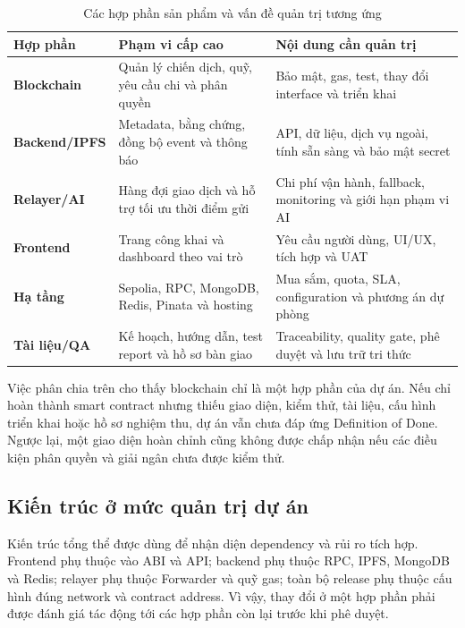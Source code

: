 \begin{table}[H]
\centering
\caption{Các hợp phần sản phẩm và vấn đề quản trị tương ứng}
\label{tab:product-components}
\begin{tabularx}{\textwidth}{| >{\bfseries}p{3.1cm} | p{5.2cm} | X |}
\hline
Hợp phần & Phạm vi cấp cao & Nội dung cần quản trị \\
\hline
Blockchain & Quản lý chiến dịch, quỹ, yêu cầu chi và phân quyền & Bảo mật, gas, test, thay đổi interface và triển khai \\ \hline
Backend/IPFS & Metadata, bằng chứng, đồng bộ event và thông báo & API, dữ liệu, dịch vụ ngoài, tính sẵn sàng và bảo mật secret \\ \hline
Relayer/AI & Hàng đợi giao dịch và hỗ trợ tối ưu thời điểm gửi & Chi phí vận hành, fallback, monitoring và giới hạn phạm vi AI \\ \hline
Frontend & Trang công khai và dashboard theo vai trò & Yêu cầu người dùng, UI/UX, tích hợp và UAT \\ \hline
Hạ tầng & Sepolia, RPC, MongoDB, Redis, Pinata và hosting & Mua sắm, quota, SLA, configuration và phương án dự phòng \\ \hline
Tài liệu/QA & Kế hoạch, hướng dẫn, test report và hồ sơ bàn giao & Traceability, quality gate, phê duyệt và lưu trữ tri thức \\
\hline
\end{tabularx}
\end{table}

Việc phân chia trên cho thấy blockchain chỉ là một hợp phần của dự án. Nếu chỉ hoàn thành smart contract nhưng thiếu giao diện, kiểm thử, tài liệu, cấu hình triển khai hoặc hồ sơ nghiệm thu, dự án vẫn chưa đáp ứng Definition of Done. Ngược lại, một giao diện hoàn chỉnh cũng không được chấp nhận nếu các điều kiện phân quyền và giải ngân chưa được kiểm thử.

\subsection{Kiến trúc ở mức quản trị dự án}

Kiến trúc tổng thể được dùng để nhận diện dependency và rủi ro tích hợp. Frontend phụ thuộc vào ABI và API; backend phụ thuộc RPC, IPFS, MongoDB và Redis; relayer phụ thuộc Forwarder và quỹ gas; toàn bộ release phụ thuộc cấu hình đúng network và contract address. Vì vậy, thay đổi ở một hợp phần phải được đánh giá tác động tới các hợp phần còn lại trước khi phê duyệt.


